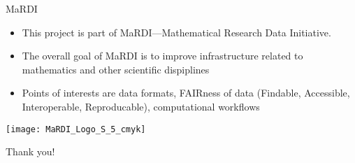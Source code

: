 \documentclass[10pt, aspectratio=169, progressbar=frametitle]{beamer}
\begin{document}
\begin{frame}{MaRDI}
  \begin{itemize}
    \item This project is part of MaRDI---Mathematical Research Data Initiative.
    \item The overall goal of MaRDI is to improve infrastructure related
          to mathematics and other scientific dispiplines
    \item Points of interests are data formats, FAIRness of data
          (Findable, Accessible, Interoperable, Reproducable), computational
          workflows
  \end{itemize}
  \vspace{-2cm}
  \texttt{[image: MaRDI\_Logo\_S\_5\_cmyk]}
\end{frame}

\begin{frame}[standout]{}
  \centering
  \huge{Thank you!}
\end{frame}
\end{document}
